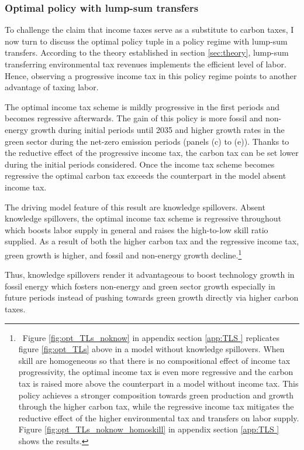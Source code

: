 \subsubsection{Optimal policy with lump-sum transfers}\label{subsec:tls}
To challenge the claim that income taxes serve as a substitute to carbon taxes, I now turn to discuss the optimal policy tuple in a policy regime with lump-sum transfers. According to the theory established in section \ref{sec:theory}, lump-sum transferring environmental tax revenues implements the efficient level of labor. 
Hence, observing a progressive income tax in this policy regime points to another advantage of taxing labor. 

The optimal income tax scheme is mildly progressive in the first periods and becomes regressive afterwards. The gain of this policy is more fossil and non-energy growth during initial periods until 2035  and higher growth rates in the green sector during the net-zero emission periods (panels (c) to (e)). %
Thanks to the reductive effect of the progressive income tax, the carbon tax can be set lower during the initial periods considered. Once the income tax scheme becomes regressive the optimal carbon tax exceeds the counterpart in the model absent income tax. 


The driving model feature of this result are knowledge spillovers. Absent knowledge spillovers, the optimal income tax scheme is regressive throughout which boosts labor supply in general and raises the high-to-low skill ratio supplied.  As a result of both the higher carbon tax and the regressive income tax, green growth is higher, and fossil and non-energy growth decline.\footnote{\ Figure \ref{fig:opt_TLs_noknow} in appendix section \ref{app:TLS } replicates figure \ref{fig:opt_TLs} above in a model without knowledge spillovers. 
	 When skill are homogeneous so that there is no compositional effect of income tax progressivity, the optimal income tax is even more regressive and the carbon tax is raised more above the counterpart in a model without income tax. This policy achieves a stronger composition towards green production and growth through the higher carbon tax, while the regressive income tax mitigates the reductive effect of the higher environmental tax and transfers on labor supply. Figure \ref{fig:opt_TLs_noknow_homoskill} in appendix section \ref{app:TLS } shows the results.}

Thus, knowledge spillovers render it advantageous to boost technology growth in fossil energy which fosters non-energy and green sector growth especially in future periods instead of pushing towards green growth directly via higher carbon taxes. 

